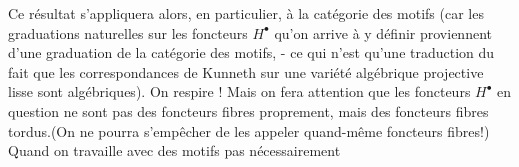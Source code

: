  Ce résultat s'appliquera alors, en particulier, à la catégorie des motifs (car les  graduations naturelles sur les foncteurs $H^\bullet$ qu'on arrive à y définir  proviennent d'une graduation de la catégorie des motifs, - ce qui n'est qu'une traduction du fait que les correspondances de Kunneth sur une variété algébrique projective lisse sont algébriques). On respire ! Mais on fera attention que les foncteurs $H^\bullet$ en question ne sont pas des foncteurs fibres proprement, mais des foncteurs fibres tordus.(On ne pourra s'empêcher de les appeler quand-même foncteurs fibres!) Quand on travaille avec des motifs pas nécessairement

